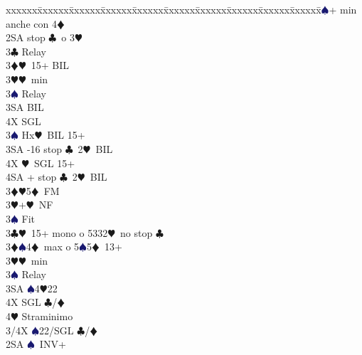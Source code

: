 \documentclass[a4paper,italian]{article}
\newcommand{\BC}{\textcolor{OliveGreen}{$\clubsuit$}}
\newcommand{\BD}{\textcolor{RedOrange}{$\vardiamondsuit$}}
\newcommand{\BH}{\textcolor{Red2}{$\varheartsuit${}}}
\newcommand{\BS}{\textcolor{MidnightBlue}{$\spadesuit${}}}
\newenvironment{bidtable}
{\begin{tabbing}

    xxxxxx\=xxxxxx\=xxxxxx\=xxxxxx\=xxxxxx\=xxxxxx\=xxxxxx\=xxxxxx\=xxxxxx\=xxxxxx\=\kill}
{\end{tabbing} }%
\begin{document}
\begin{multicols}{2}
\begin{bidtable}
                                            2\BS {}+ min anche con 4\BD \\
                                            2SA  stop \BC\ o 3\BH \+\\
                                            3\BC \> Relay\+\\
                                            3\BD {}\BH\ 15+ BIL\\
                                            3\BH {}\BH\ min\+\\
                                            3\BS \> Relay\+\\
                                            3SA \> BIL\\
                                            4X \> SGL\-\-\\
                                            3\BS \> Hx\BH\ BIL 15+\\
                                            3SA -16 stop \BC\ 2\BH\ BIL\\
                                            4X \BH\ SGL 15+\\
                                            4SA + stop \BC\ 2\BH\ BIL\-\\
                                            3\BD {}\BH 5\BD\ FM\\
                                            3\BH {}+\BH\ NF\\
                                            3\BS \> Fit\-\\
                                            3\BC {}\BH\ 15+ mono o 5332\BH\ no stop \BC \\
                                            3\BD {}\BS 4\BD\ max o 5\BS 5\BD\ 13+\\
                                            3\BH {}\BH\ min\+\\
                                            3\BS \> Relay\+\\
                                            3SA \BS 4\BH 22\\
                                            4X \> SGL \BC /\BD \\
                                            4\BH \> Straminimo\-\-\\
                                            3/4X \BS 22/SGL \BC /\BD \-\\
                                            2SA \BS\ INV+\+\\

\end{bidtable}
\end{multicols}
\end{document}
